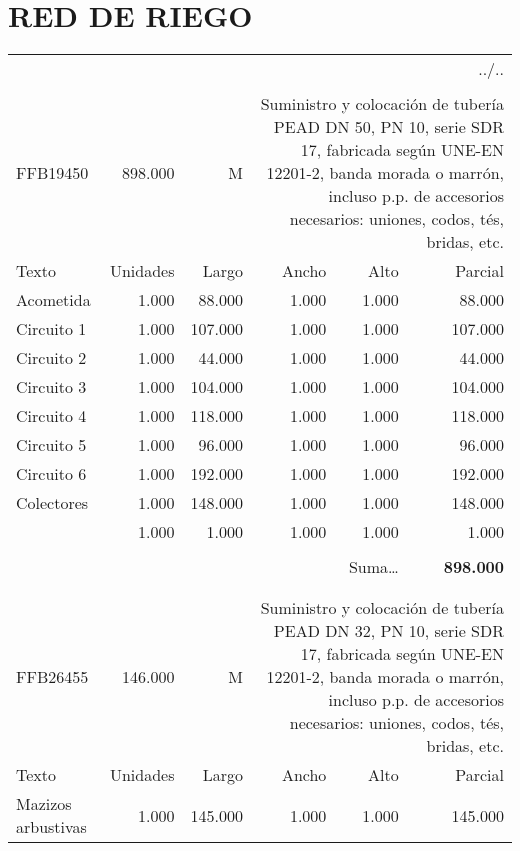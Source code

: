 \documentclass{book}%
\begin{document}
%
\section{RED DE RIEGO}%
\label{sec:REDDERIEGO}%
\begin{longtable}{lrrrrr}%
\multicolumn{6}{r}{../..}\\%
\endfoot%
\endlastfoot%
&&&&&\\%
FFB19450&898.000& M&\multicolumn{3}{p{6cm}}{\scriptsize Suministro y colocación de tubería PEAD DN 50, PN 10, serie SDR 17, fabricada según UNE-EN 12201-2, banda morada o marrón, incluso  p.p. de accesorios necesarios: uniones, codos, tés, bridas, etc.\normalsize}\\%
Texto&Unidades&Largo&Ancho&Alto&Parcial\\%
\hline%
\multicolumn{1}{p{3.5cm}}{Acometida}&1.000&88.000&1.000&1.000&88.000\\%
\multicolumn{1}{p{3.5cm}}{Circuito 1}&1.000&107.000&1.000&1.000&107.000\\%
\multicolumn{1}{p{3.5cm}}{Circuito 2}&1.000&44.000&1.000&1.000&44.000\\%
\multicolumn{1}{p{3.5cm}}{Circuito 3}&1.000&104.000&1.000&1.000&104.000\\%
\multicolumn{1}{p{3.5cm}}{Circuito 4}&1.000&118.000&1.000&1.000&118.000\\%
\multicolumn{1}{p{3.5cm}}{Circuito 5}&1.000&96.000&1.000&1.000&96.000\\%
\multicolumn{1}{p{3.5cm}}{Circuito 6}&1.000&192.000&1.000&1.000&192.000\\%
\multicolumn{1}{p{3.5cm}}{Colectores}&1.000&148.000&1.000&1.000&148.000\\%
\multicolumn{1}{p{3.5cm}}{}&1.000&1.000&1.000&1.000&1.000\\%
&&&&&\\%
\multicolumn{5}{r}{Suma\ldots}&\textbf{898.000}\\%
\hline%
&&&&&\\%
&&&&&\\%
FFB26455&146.000& M&\multicolumn{3}{p{6cm}}{\scriptsize Suministro y colocación de tubería PEAD DN 32, PN 10, serie SDR 17, fabricada según UNE-EN 12201-2, banda morada o marrón, incluso  p.p. de accesorios necesarios: uniones, codos, tés, bridas, etc.\normalsize}\\%
Texto&Unidades&Largo&Ancho&Alto&Parcial\\%
\hline%
\multicolumn{1}{p{3.5cm}}{Mazizos arbustivas}&1.000&145.000&1.000&1.000&145.000\\%

\end{longtable}
\end{document}
